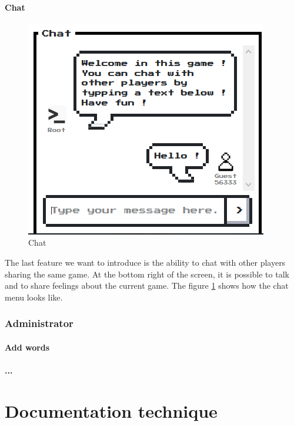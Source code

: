 \documentclass{tnreport}
\begin{document}
\subsubsection{Chat}

\begin{figure}
	\centering
	\vspace*{-2cm}
	\includegraphics[scale=0.58]{figures/chat}
	\caption{Chat}
	\label{fig:chat}
\end{figure}

The last feature we want to introduce is the ability to chat with other players sharing the same game. At the bottom right of the screen, it is possible to talk and to share feelings about the current game. The figure \ref{fig:chat} shows how the chat menu looks like.

\subsection{Administrator}

\subsubsection{Add words}

\subsubsection{...}

\cleardoublepage

\chapter{Documentation technique}
\end{document}
